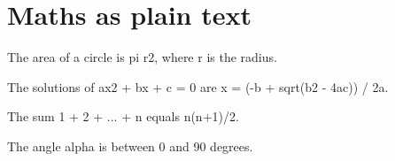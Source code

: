 \documentclass{article}
\begin{document}
\section*{Maths as plain text}
The area of a circle is pi r2, where r is the radius.

The solutions of ax2 + bx + c = 0 are x = (-b + sqrt(b2 - 4ac)) / 2a.

The sum 1 + 2 + ... + n equals n(n+1)/2.

The angle alpha is between 0 and 90 degrees.
\end{document}

